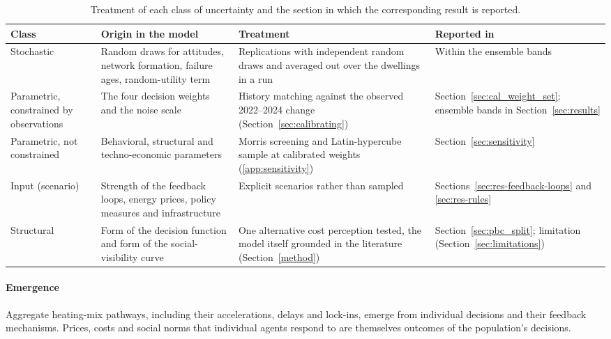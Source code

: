 \documentclass[preprint,12pt,authoryear]{elsarticle}
\begin{document}
\begin{table}[htbp]
  \centering
  \caption{Treatment of each class of uncertainty and the section in which
  the corresponding result is reported.}
  \label{tab:uncertainty}
  \footnotesize
  \setlength{\tabcolsep}{4pt}
  \begin{tabular}{@{}L{2.5cm} L{3.3cm} L{4.2cm} L{2.4cm}@{}}
    \toprule
    \textbf{Class} & \textbf{Origin in the model} & \textbf{Treatment} &
    \textbf{Reported in}\\
    \midrule
    Stochastic & Random draws for attitudes, network formation, failure ages,
      random-utility term & Replications with independent random draws and
      averaged out over the dwellings in a run & Within the ensemble bands\\
    \addlinespace
    Parametric, constrained by observations & The four decision weights and
      the noise scale & History matching against the observed
      2022--2024 change (Section~\ref{sec:calibrating}) &
      Section~\ref{sec:cal_weight_set}; ensemble bands in
      Section~\ref{sec:results}\\
    \addlinespace
    Parametric, not constrained & Behavioral, structural and techno-economic
      parameters & Morris screening and Latin-hypercube sample at calibrated
      weights (\ref{app:sensitivity}) & Section~\ref{sec:sensitivity}\\
    \addlinespace
    Input (scenario) & Strength of the feedback loops, energy prices, policy
      measures and infrastructure & Explicit scenarios rather than sampled &
      Sections~\ref{sec:res-feedback-loops} and \ref{sec:res-rules}\\
    \addlinespace
    Structural & Form of the decision function and form of the social-visibility
      curve & One alternative cost perception tested, the model itself grounded in
      the literature (Section~\ref{method}) & Section~\ref{sec:pbc_split};
      limitation (Section~\ref{sec:limitations})\\
    \bottomrule
  \end{tabular}
\end{table}

\paragraph{Emergence}
Aggregate heating-mix pathways, including their accelerations, delays and
lock-ins, emerge from individual decisions and their feedback mechanisms. 
Prices, costs and social norms that individual agents respond to are
themselves outcomes of the population's decisions.
\end{document}
